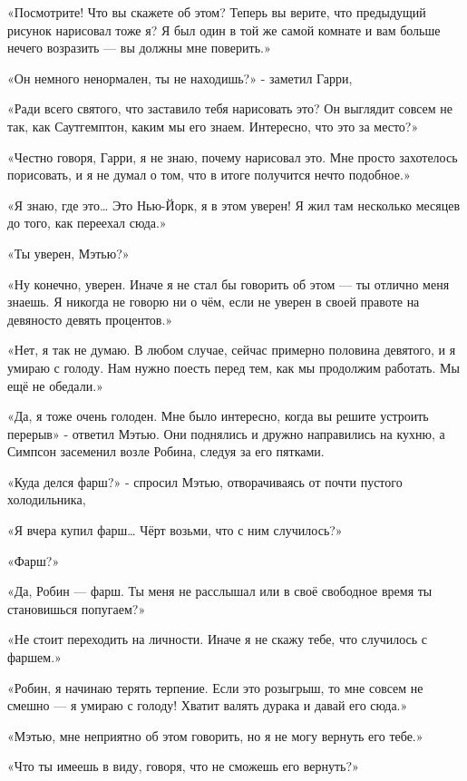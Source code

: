 \documentclass[a4paper,12pt]{book}
\begin{document}
\par
«Посмотрите! Что вы скажете об этом? Теперь вы верите, что предыдущий рисунок нарисовал тоже я? Я был один в той же самой комнате и вам больше нечего возразить — вы должны мне поверить.»
\par
«Он немного ненормален, ты не находишь?» - заметил Гарри,
\par
«Ради всего святого, что заставило тебя нарисовать это? Он выглядит совсем не так, как Саутгемптон, каким мы его знаем. Интересно, что это за место?»
\par
«Честно говоря, Гарри, я не знаю, почему нарисовал это. Мне просто захотелось порисовать, и я не думал о том, что в итоге получится нечто подобное.»
\par
«Я знаю, где это… Это Нью-Йорк, я в этом уверен! Я жил там несколько месяцев до того, как переехал сюда.»
\par
«Ты уверен, Мэтью?»
\par
«Ну конечно, уверен. Иначе я не стал бы говорить об этом — ты отлично меня знаешь. Я никогда не говорю ни о чём, если не уверен в своей правоте на девяносто девять процентов.»
\par
«Нет, я так не думаю. В любом случае, сейчас примерно половина девятого, и я умираю с голоду. Нам нужно поесть перед тем, как мы продолжим работать. Мы ещё не обедали.»
\par
«Да, я тоже очень голоден. Мне было интересно, когда вы решите устроить перерыв» - ответил Мэтью. Они поднялись и дружно направились на кухню, а Симпсон засеменил возле Робина, следуя за его пятками.
\par
«Куда делся фарш?» - спросил Мэтью, отворачиваясь от почти пустого холодильника,
\par
«Я вчера купил фарш… Чёрт возьми, что с ним случилось?»
\par
«Фарш?»
\par
«Да, Робин — фарш. Ты меня не расслышал или в своё свободное время ты становишься попугаем?»
\par
«Не стоит переходить на личности. Иначе я не скажу тебе, что случилось с фаршем.»
\par
«Робин, я начинаю терять терпение. Если это розыгрыш, то мне совсем не смешно — я умираю с голоду! Хватит валять дурака и давай его сюда.»
\par
«Мэтью, мне неприятно об этом говорить, но я не могу вернуть его тебе.»
\par
«Что ты имеешь в виду, говоря, что не сможешь его вернуть?»
\par
\end{document}

